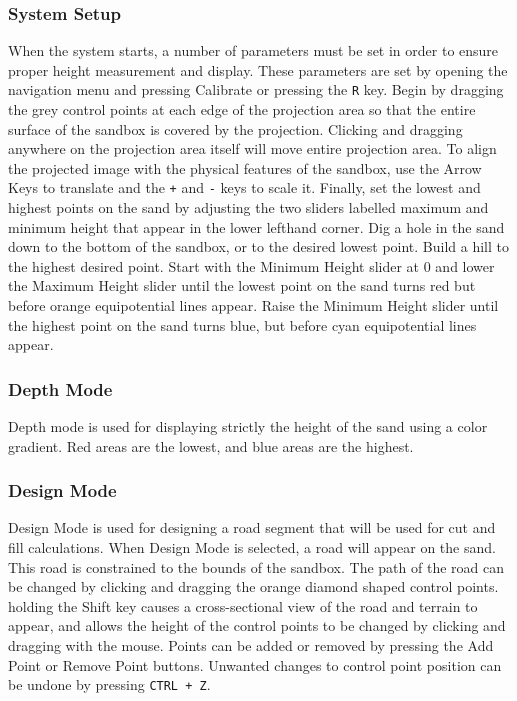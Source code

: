 \documentclass[onecolumn, draftclsnofoot,10pt, compsoc]{IEEEtran}
\begin{document}
\subsubsection{System Setup}
When the system starts, a number of parameters must be set in order to ensure proper height measurement and display. These parameters are set by opening the navigation menu and pressing Calibrate or pressing the \texttt{R} key. Begin by dragging the grey control points at each edge of the projection area so that the entire surface of the sandbox is covered by the projection. Clicking and dragging anywhere on the projection area itself will move entire projection area. To align the projected image with the physical features of the sandbox, use the Arrow Keys to translate and the \texttt{+} and \texttt{-} keys to scale it. Finally, set the lowest and highest points on the sand by adjusting the two sliders labelled maximum and minimum height that appear in the lower lefthand corner. Dig a hole in the sand down to the bottom of the sandbox, or to the desired lowest point. Build a hill to the highest desired point. Start with the Minimum Height slider at 0 and lower the Maximum Height slider until the lowest point on the sand turns red but before orange equipotential lines appear. Raise the Minimum Height slider until the highest point on the sand turns blue, but before cyan equipotential lines appear.
\subsubsection{Depth Mode}
Depth mode is used for displaying strictly the height of the sand using a color gradient. Red areas are the lowest, and blue areas are the highest.
\subsubsection{Design Mode}
Design Mode is used for designing a road segment that will be used for cut and fill calculations. When Design Mode is selected, a road will appear on the sand. This road is constrained to the bounds of the sandbox. The path of the road can be changed by clicking and dragging the orange diamond shaped control points. holding the Shift key causes a cross-sectional view of the road and terrain to appear, and allows the height of the control points to be changed by clicking and dragging with the mouse. Points can be added or removed by pressing the Add Point or Remove Point buttons. Unwanted changes to control point position can be undone by pressing \texttt{CTRL + Z}.
\end{document}
